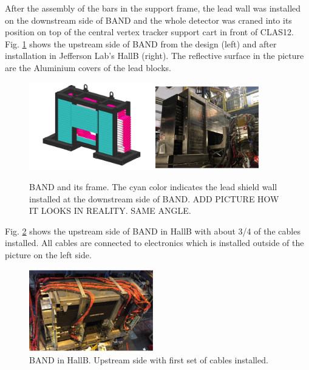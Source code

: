 \documentclass[3p,final,twocolumn]{elsarticle}
\begin{document}
After the assembly of the bars in the support frame, the lead wall was installed on the downstream side of BAND and the whole detector was craned into its position on top of the central vertex tracker support cart in front of CLAS12. Fig. \ref{fig:band_downstream} shows the upstream side of BAND from the design (left) and after installation in Jefferson Lab's HallB (right). The reflective surface in the picture are the Aluminium covers of the lead blocks. 
\begin{figure}[th]
	\centering
	\includegraphics[width=0.48\textwidth]{BAND_1-2.png} 
	\includegraphics[width=0.40\textwidth]{pic-bandinhall1.pdf}
		\caption{BAND and its frame. The cyan color indicates the lead shield wall installed at the downstream side of BAND. ADD PICTURE HOW IT LOOKS IN REALITY. SAME ANGLE.}
		\label{fig:band_downstream}
\end{figure}

Fig. \ref{fig:bandinhall} shows the upstream side of BAND in HallB with about 3/4 of the cables installed. All cables are connected to electronics which is installed outside of the picture on the left side.
\begin{figure}[tb]
	\centering
	\includegraphics[width=0.48\textwidth]{pic-bandinhall2.pdf}
				\caption{BAND in HallB. Upstream side with first set of cables installed.}
		\label{fig:bandinhall}
\end{figure}
\end{document}
